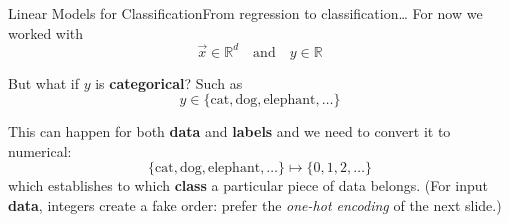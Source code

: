\begin{frame}{Linear Models for Classification}{From regression to classification\dots}
    For now we worked with
    \begin{equation*}
        \vec{x} \in \mathbb{R}^{d}
        \quad \text{and} \quad
        y \in \mathbb{R}
    \end{equation*}

    But what if $y$ is \textbf{categorical}? Such as
    \begin{equation*}
        y \in \{ \text{cat}, \text{dog}, \text{elephant}, \dots \}
    \end{equation*}

    \vfill \pause

    This can happen for both \textbf{data} and \textbf{labels} and we need to convert it to numerical:
    \begin{equation*}
        \{ \text{cat}, \text{dog}, \text{elephant}, \dots \} \mapsto \{ 0, 1, 2, \dots \}
    \end{equation*}
    which establishes to which \textbf{class} a particular piece of data belongs.
        {\footnotesize (For input \textbf{data}, integers create a fake order: prefer the \emph{one-hot encoding} of the next slide.)}
\end{frame}

